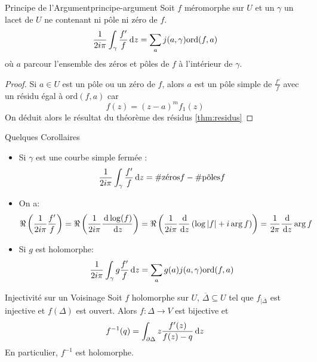 \documentclass{cours}
\begin{document}
\begin{théorème}
	{Principe de l'Argument}{principe-argument}
	Soit $f$ méromorphe sur $U$ et un $\gamma$ un lacet de $U$ ne contenant ni pôle ni zéro de $f$. 
	\begin{equation*}
		\frac{1}{2i\pi} \int_{\gamma}\frac{f'}{f}{\rm \, d} z = \sum_{a}j(a, \gamma)\mathrm{ord}(f, a)
	\end{equation*}
	où $a$ parcour l'ensemble des zéros et pôles de $f$ à l'intérieur de $\gamma$. 
\end{théorème}
\begin{proof}
	Si $a \in U$ est un pôle ou un zéro de $f$, alors $a$ est un pôle simple de $\frac{f'}{f}$ avec un résidu égal à $\mathrm{ord}(f, a)$ car
	\begin{equation*}
		f(z) = (z - a)^{m}f_{1}(z)
	\end{equation*}
	On déduit alors le résultat du théorème des résidus \ref{thm:residus}
\end{proof}

\begin{propositionfr}
	{Quelques Corollaires}{}
	\begin{itemize}
		\item Si $\gamma$ est une courbe simple fermée : 
			\begin{equation*}
				\frac{1}{2i\pi}\int_{\gamma}\frac{f'}{f} {\rm \, d} z = \text{\#zéros}f - \text{\#pôles}f
			\end{equation*}
		\item On a: 
			\begin{equation*}
				\Re\left(\frac{1}{2i\pi}\frac{f'}{f}\right) = \Re\left(\frac{1}{2i\pi}\frac{{\rm \, d} \log(f)}{{\rm \, d} z}\right) = \Re\left(\frac{1}{2i\pi}\frac{{\rm \, d}}{{\rm \, d} z}\left(\log \left|f\right| + i\arg f\right)\right) = \frac{1}{2\pi}\frac{{\rm \, d}}{{\rm \, d} z}\arg f
			\end{equation*}
		\item Si $g$ est holomorphe:
			\begin{equation*}
				\frac{1}{2i\pi} \int_{\gamma}g\frac{f'}{f}{\rm \, d} z = \sum_{a} g(a)j(a, \gamma)\mathrm{ord}(f, a)
			\end{equation*}
	\end{itemize}
\end{propositionfr}

\begin{propositionfr}
	{Injectivité sur un Voisinage}{}
	Soit $f$ holomorphe sur $U$, $\overline{\Delta}\subseteq U$ tel que $f_{\mid \overline{\Delta}}$ est injective et $f\left(\Delta\right)$ est ouvert. Alors $f: \Delta \to V$ est bijective et 
	\begin{equation*}
		f^{-1}(q) = \int_{\partial \Delta}z\frac{f'(z)}{f(z) - q}{\rm \, d} z 
	\end{equation*}
	En particulier, $f^{-1}$ est holomorphe. 
\end{propositionfr}
\end{document}
